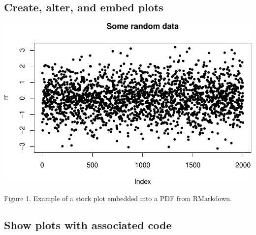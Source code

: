 \documentclass[portrait]{article}
\begin{document}
\newpage  

\subsection{Create, alter, and embed
plots}\label{create-alter-and-embed-plots}

\includegraphics{Lesson5_rmd_files/figure-latex/unnamed-chunk-1-1.pdf}

Figure 1. Example of a stock plot embedded into a PDF from RMarkdown.

\newpage  

\subsection{Show plots with associated
code}\label{show-plots-with-associated-code}
\end{document}
